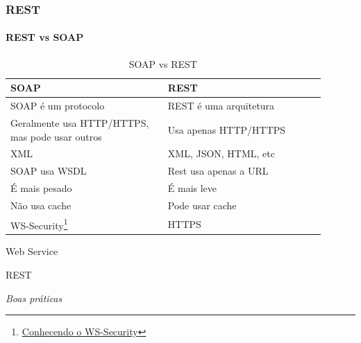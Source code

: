 \documentclass[
	9pt, %
	t, %
]{beamer}
\begin{document}
\begin{frame}
	\frametitle{REST}
	\framesubtitle{REST vs SOAP}

	\begin{table}
		\renewcommand{\arraystretch}{1.25} %
		\begin{tabular}{|p{0.45\linewidth}|p{0.45\linewidth}|}
			\hline
			\textbf{SOAP}                                                                                                                & \textbf{REST}          \\ \hline
			SOAP é um protocolo                                                                                                          & REST é uma arquitetura \\ \hline
			Geralmente usa HTTP/HTTPS, mas pode usar outros                                                                              & Usa apenas HTTP/HTTPS  \\ \hline
			XML                                                                                                                          & XML, JSON, HTML, etc   \\ \hline
			SOAP usa WSDL                                                                                                                & Rest usa apenas a URL  \\ \hline
			É mais pesado                                                                                                                & É mais leve            \\ \hline
			Não usa cache                                                                                                                & Pode usar cache        \\ \hline
			WS-Security\footnote{\href{https://xaropedecafe.medium.com/conhecendo-o-ws-security-c6c775b461fd}{Conhecendo o WS-Security}} & HTTPS                  \\ \hline
		\end{tabular}
		\caption{SOAP vs REST}
		\label{tab:soap_rest}

	\end{table}

\end{frame}

\begin{frame}
	\begin{center}

		\bigskip\bigskip\bigskip\bigskip %
		{\Large Web Service}

		\bigskip\bigskip %
		{\Huge REST}

		\smallskip
		{\small \textit{Boas práticas}}
	\end{center}

\end{frame}
\end{document}
